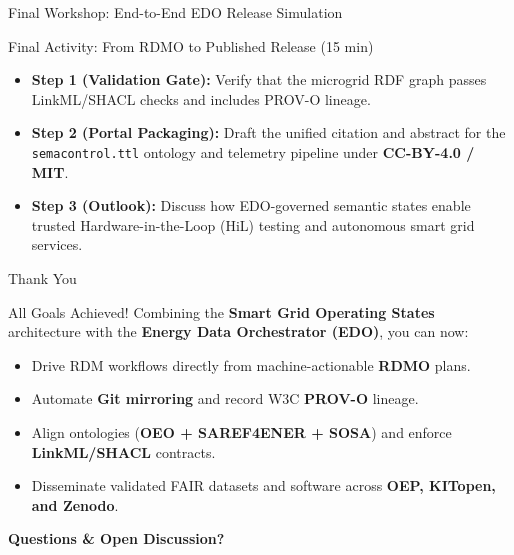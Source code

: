 \documentclass[aspectratio=169]{beamer}
\begin{document}
\begin{frame}{Final Workshop: End-to-End EDO Release Simulation}
    \begin{block}{Final Activity: From RDMO to Published Release (15 min)}
        \begin{itemize}
            \item \textbf{Step 1 (Validation Gate):} Verify that the microgrid RDF graph passes LinkML/SHACL checks and includes PROV-O lineage.
            \item \textbf{Step 2 (Portal Packaging):} Draft the unified citation and abstract for the \texttt{semacontrol.ttl} ontology and telemetry pipeline under \textbf{CC-BY-4.0 / MIT}.
            \item \textbf{Step 3 (Outlook):} Discuss how EDO-governed semantic states enable trusted Hardware-in-the-Loop (HiL) testing and autonomous smart grid services.
        \end{itemize}
    \end{block}
\end{frame}

\begin{frame}{Thank You}
    \begin{block}{All Goals Achieved!}
        Combining the \textbf{Smart Grid Operating States} architecture with the \textbf{Energy Data Orchestrator (EDO)}, you can now:
        \begin{itemize}
            \item Drive RDM workflows directly from machine-actionable \textbf{RDMO} plans.
            \item Automate \textbf{Git mirroring} and record W3C \textbf{PROV-O} lineage.
            \item Align ontologies (\textbf{OEO + SAREF4ENER + SOSA}) and enforce \textbf{LinkML/SHACL} contracts.
            \item Disseminate validated FAIR datasets and software across \textbf{OEP, KITopen, and Zenodo}.
        \end{itemize}
    \end{block}
    
    \begin{center}
        \vfill
        \textbf{Questions \& Open Discussion?}
    \end{center}
\end{frame}
\end{document}

